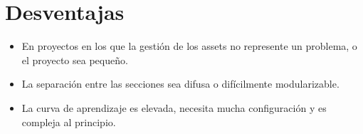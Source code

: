 \section{Desventajas}
\begin{itemize}
    \item En proyectos en los que la gestión de los assets no represente un problema, o el proyecto sea pequeño.
    \item La separación entre las secciones sea difusa o difícilmente modularizable.
    \item La curva de aprendizaje es elevada, necesita mucha configuración y es compleja al principio.
\end{itemize}